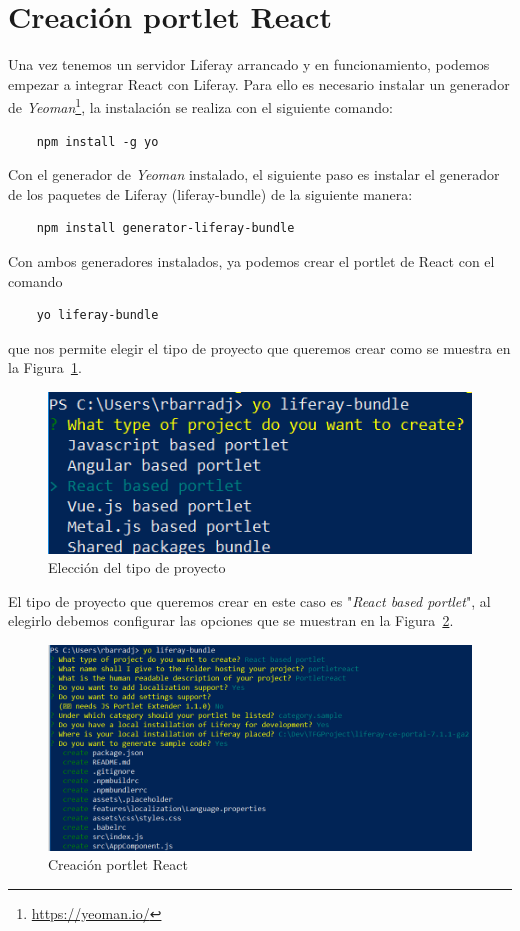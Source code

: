 \documentclass[a4paper, 12pt]{book}
\begin{document}
\section{Creación portlet React}
\label{sec:creacion-portlet-react}
Una vez tenemos un servidor Liferay arrancado y en funcionamiento, podemos empezar a integrar React con Liferay. Para ello es necesario instalar un generador de \textit{Yeoman}\footnote{\url{https://yeoman.io/}}, la instalación se realiza con el siguiente comando: 
\begin{verbatim}
    npm install -g yo
\end{verbatim}

Con el generador de \textit{Yeoman} instalado, el siguiente paso es instalar el generador de los paquetes de Liferay (liferay-bundle) de la siguiente manera:
\begin{verbatim}
    npm install generator-liferay-bundle
\end{verbatim}

Con ambos generadores instalados, ya podemos crear el portlet de React con el comando 
\begin{verbatim}
    yo liferay-bundle
\end{verbatim} 
que nos permite elegir el tipo de proyecto que queremos crear como se muestra en la Figura~\ref{fig:liferay_type}.
\begin{figure}[h]
  \centering
  \includegraphics{img_usadas/liferay-bundle-react.png}
  \caption{Elección del tipo de proyecto}
  \label{fig:liferay_type}
\end{figure}

El tipo de proyecto que queremos crear en este caso es "\textit{React based portlet}", al elegirlo debemos configurar las opciones que se muestran en la Figura~\ref{fig:liferay_generator_portlet}.
\begin{figure}[t]
  \centering
  \includegraphics{img_usadas/liferay-bundle-generator.png}
  \caption{Creación portlet React}
  \label{fig:liferay_generator_portlet}
\end{figure}
\end{document}
